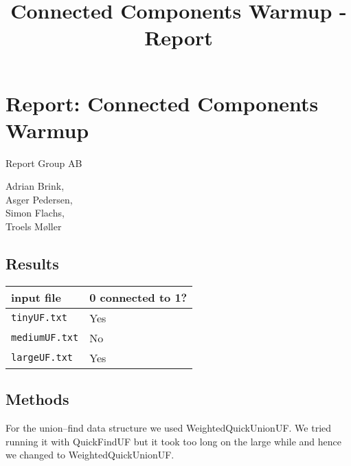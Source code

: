 \documentclass{scrartcl}
\title{Connected Components Warmup - Report}
\begin{document}
\maketitle

\section{Report: Connected Components Warmup}

Report Group AB 

\centering
Adrian Brink,\\
Asger Pedersen,\\
Simon Flachs,\\
Troels M{\o}ller
\justify

\subsection{Results}

\begin{tabular}{ll}

  \toprule
  input file & 0 connected to 1? \\
  \midrule
  {\tt tinyUF.txt} & Yes \\
  {\tt mediumUF.txt} & No \\
  {\tt largeUF.txt} & Yes \\
  \bottomrule
\end{tabular}

\subsection{Methods}

For the union--find data structure we used WeightedQuickUnionUF.
We tried running it with QuickFindUF but it took too long on the large while and hence we changed to WeightedQuickUnionUF.
\end{document}
